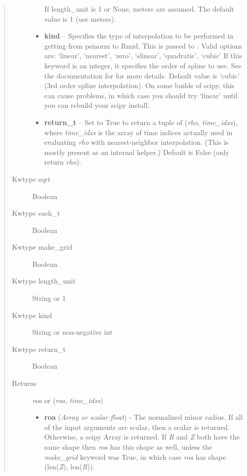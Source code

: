 \documentclass[letterpaper,10pt,english]{sphinxmanual}
\begin{document}
\begin{fulllineitems}
\begin{fulllineitems}
\begin{quote}
\begin{description}
\begin{itemize}
\begin{quote}
\end{quote}

If length\_unit is 1 or None, meters are assumed. The default
value is 1 (use meters).


\item {} 
\textbf{kind} -- Specifies the type of
interpolation to be performed in getting from psinorm to
Rmid. This is passed to
. Valid options are:
`linear', `nearest', `zero', `slinear', `quadratic', `cubic'
If this keyword is an integer, it specifies the order of spline
to use. See the documentation for  for more
details. Default value is `cubic' (3rd order spline
interpolation). On some builds of scipy, this can cause problems,
in which case you should try `linear' until you can rebuild your
scipy install.

\item {} 
\textbf{return\_t} -- Set to True to return a tuple of (\emph{rho},
\emph{time\_idxs}), where \emph{time\_idxs} is the array of time indices
actually used in evaluating \emph{rho} with nearest-neighbor
interpolation. (This is mostly present as an internal helper.)
Default is False (only return \emph{rho}).

\end{itemize}

\item[{Kwtype sqrt}] \leavevmode
Boolean

\item[{Kwtype each\_t}] \leavevmode
Boolean

\item[{Kwtype make\_grid}] \leavevmode
Boolean

\item[{Kwtype length\_unit}] \leavevmode
String or 1

\item[{Kwtype kind}] \leavevmode
String or non-negative int

\item[{Kwtype return\_t}] \leavevmode
Boolean

\item[{Returns}] \leavevmode

\emph{roa} or (\emph{roa}, \emph{time\_idxs})
\begin{itemize}
\item {} 
\textbf{roa} (\emph{Array or scalar float}) - The normalized minor radius.
If all of the input arguments are scalar, then a scalar
is returned. Otherwise, a scipy Array is returned. If \emph{R} and \emph{Z}
both have the same shape then \emph{roa} has this shape as well,
unless the \emph{make\_grid} keyword was True, in which case \emph{roa}
has shape (len(\emph{Z}), len(\emph{R})).


\end{itemize}
\end{description}
\end{quote}
\end{fulllineitems}
\end{fulllineitems}
\end{document}
